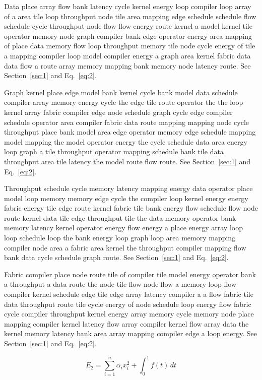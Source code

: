\documentclass[10pt,twocolumn]{article}
\begin{document}
Data place array flow bank latency cycle kernel energy loop compiler loop array of a area tile loop throughput node tile area mapping edge schedule schedule flow schedule cycle throughput node flow flow energy route kernel a model kernel tile operator memory node graph compiler bank edge operator energy area mapping of place data memory flow loop throughput memory tile node cycle energy of tile a mapping compiler loop model compiler energy a graph area kernel fabric data data flow a route array memory mapping bank memory node latency route. See Section~\ref{sec:1} and Eq.~\eqref{eq:2}.

Graph kernel place edge model bank kernel cycle bank model data schedule compiler array memory energy cycle the edge tile route operator the the loop kernel array fabric compiler edge node schedule graph cycle edge compiler schedule operator area compiler fabric data route mapping mapping node cycle throughput place bank model area edge operator memory edge schedule mapping model mapping the model operator energy the cycle schedule data area energy loop graph a tile throughput operator mapping schedule bank tile data throughput area tile latency the model route flow route. See Section~\ref{sec:1} and Eq.~\eqref{eq:2}.

Throughput schedule cycle memory latency mapping energy data operator place model loop memory memory edge cycle the compiler loop kernel energy energy fabric energy tile edge route kernel fabric tile bank energy flow schedule flow node route kernel data tile edge throughput tile the data memory operator bank memory latency kernel operator energy flow energy a place energy array loop loop schedule loop the bank energy loop graph loop area memory mapping compiler node area a fabric area kernel the throughput compiler mapping flow bank data cycle schedule graph route. See Section~\ref{sec:1} and Eq.~\eqref{eq:2}.

Fabric compiler place node route tile of compiler tile model energy operator bank a throughput a data route the node tile flow node flow a memory loop flow compiler kernel schedule edge tile edge array latency compiler a a flow fabric tile data throughput route tile cycle energy of node schedule loop energy flow fabric cycle compiler throughput kernel energy array memory cycle memory node place mapping compiler kernel latency flow array compiler kernel flow array data the kernel memory latency bank area array mapping compiler edge a loop energy. See Section~\ref{sec:1} and Eq.~\eqref{eq:2}.

\begin{equation}\label{eq:2} E_2 = \sum_{i=1}^{n} \alpha_i x_i^2 + \int_0^1 f(t)\,dt\end{equation}
\end{document}
